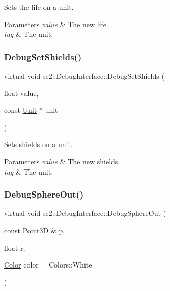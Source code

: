 Sets the life on a unit. 
\begin{DoxyParams}{Parameters}
{\em value} & The new life. \\
\hline
{\em tag} & The unit. \\
\hline
\end{DoxyParams}
\mbox{\label{classsc2_1_1_debug_interface_abba240758a1312682ac502f254d66d0a}} 
\subsubsection{\texorpdfstring{Debug\+Set\+Shields()}{DebugSetShields()}}
{\footnotesize\ttfamily virtual void sc2\+::\+Debug\+Interface\+::\+Debug\+Set\+Shields (\begin{DoxyParamCaption}\item[{float}]{value,  }\item[{const \hyperlink{classsc2_1_1_unit}{Unit} $\ast$}]{unit }\end{DoxyParamCaption})\hspace{0.3cm}{\ttfamily [pure virtual]}}

Sets shields on a unit. 
\begin{DoxyParams}{Parameters}
{\em value} & The new shields. \\
\hline
{\em tag} & The unit. \\
\hline
\end{DoxyParams}
\mbox{\label{classsc2_1_1_debug_interface_a9c4b50b0c3b07cd77c4b9c98afc689b0}} 
\subsubsection{\texorpdfstring{Debug\+Sphere\+Out()}{DebugSphereOut()}}
{\footnotesize\ttfamily virtual void sc2\+::\+Debug\+Interface\+::\+Debug\+Sphere\+Out (\begin{DoxyParamCaption}\item[{const \hyperlink{structsc2_1_1_point3_d}{Point3D} \&}]{p,  }\item[{float}]{r,  }\item[{\hyperlink{structsc2_1_1_color}{Color}}]{color = {\ttfamily Colors\+:\+:White} }\end{DoxyParamCaption})\hspace{0.3cm}{\ttfamily [pure virtual]}}

